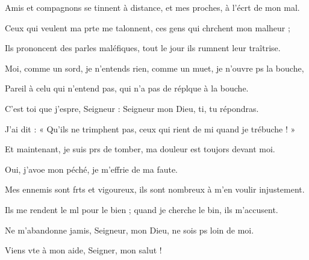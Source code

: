 \item Amis et compagnons se tinnent à distance,\psstar{} et mes proches, à l’écrt de mon mal.
\item Ceux qui veulent ma prte me talonnent,\psstar{} ces gens qui chrchent mon malheur ; 
\item Ils prononcent des parles maléfiques,\psstar{} tout le jour ils rumnent leur traîtrise.
\item Moi, comme un sord, je n’entends rien,\psstar{} comme un muet, je n’ouvre ps la bouche,
\item Pareil à celu qui n’entend pas,\psstar{} qui n’a pas de réplque à la bouche.
\item C’est toi que j’espre, Seigneur :\psstar{} Seigneur mon Dieu, ti, tu répondras.
\item J’ai dit : « Qu’ils ne trimphent pas,\psstar{} ceux qui rient de mi quand je trébuche ! »
\item Et maintenant, je suis prs de tomber,\psstar{} ma douleur est toujors devant moi.
\item Oui, j’avoe mon péché,\psstar{} je m’effrie de ma faute.
\item Mes ennemis sont frts et vigoureux,\psstar{} ils sont nombreux à m’en voulir injustement.
\item Ils me rendent le ml pour le bien ;\psstar{} quand je cherche le bin, ils m’accusent.
\item Ne m’abandonne jamis, Seigneur,\psstar{} mon Dieu, ne sois ps loin de moi.
\item Viens vte à mon aide,\psstar{} Seigner, mon salut !